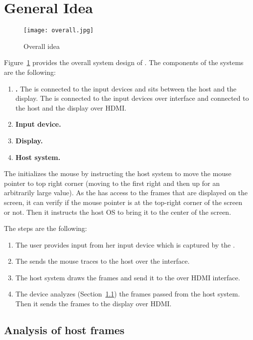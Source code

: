 \section{General Idea}
\label{sec:idea}

\begin{figure}
\centering
\texttt{[image: overall.jpg]}
\caption{Overall idea}
\label{fig:overallIdea}
\centering
\end{figure}


Figure~\ref{fig:overallIdea} provides the overall system design of \name. The components of the systems are the following:

\begin{enumerate}
  \item \textbf{\device.} The \device is connected to the input devices and sits between the host and the display. The \device is connected to the input devices over \usb interface and connected to the host and the display over HDMI.
  \item \textbf{Input device.}
  \item \textbf{Display.}
  \item \textbf{Host system.}
\end{enumerate}

 The \device initializes the mouse by instructing the host system to move the mouse pointer to top right corner (moving to the first right and then up for an arbitrarily large value). As the \device has access to the frames that are displayed on the screen, it can verify if the mouse pointer is at the top-right corner of the screen or not. Then it instructs the host OS to bring it to the center of the screen.

The steps are the following:

\begin{enumerate}
  \item The user provides input from her input device which is captured by the \device.
  \item The \device sends the mouse traces to the host over the \bluetooth interface.
  \item The host system draws the frames and send it to the \device over HDMI interface.
  \item The device analyzes (Section~\ref{sec:idea:analysis}) the frames passed from the host system. Then it sends the frames to the display over HDMI.
\end{enumerate}

\subsection{Analysis of host frames}
\label{sec:idea:analysis}

